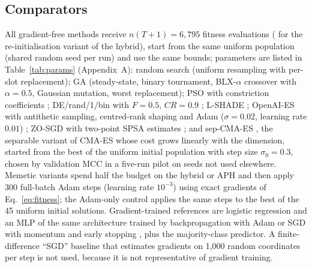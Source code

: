 \documentclass[preprint,12pt]{elsarticle}
\begin{document}
\subsection{Comparators}
All gradient-free methods receive $n(T+1)=6{,}795$ fitness evaluations (\EvalsReinit{} for the re-initialisation variant of the hybrid), start from the same uniform population (shared random seed per run) and use the same bounds; parameters are listed in Table~\ref{tab:params} (Appendix~A):
random search (uniform resampling with per-slot replacement);
GA (steady-state, binary tournament, BLX-$\alpha$ crossover with $\alpha=0.5$, Gaussian mutation, worst replacement);
PSO with constriction coefficients \citep{kennedy1995pso,clerc2002constriction};
DE/rand/1/bin with $F=0.5$, $CR=0.9$ \citep{storn1997de};
L-SHADE \citep{tanabe2014lshade};
OpenAI-ES with antithetic sampling, centred-rank shaping and Adam ($\sigma=0.02$, learning rate $0.01$) \citep{salimans2017es};
ZO-SGD with two-point SPSA estimates \citep{spall1992spsa,malladi2023mezo};
and sep-CMA-ES \citep{ros2008sepcma}, the separable variant of CMA-ES whose cost grows linearly with the dimension, started from the best of the uniform initial population with step size $\sigma_0=0.3$, chosen by validation MCC in a five-run pilot on seeds not used elsewhere.
Memetic variants spend half the budget on the hybrid or APH and then apply 300 full-batch Adam steps \citep{kingma2015adam} (learning rate $10^{-3}$) using exact gradients of Eq.~\eqref{eq:fitness}; the Adam-only control applies the same steps to the best of the 45 uniform initial solutions.
Gradient-trained references are logistic regression and an MLP of the same architecture trained by backpropagation with Adam or SGD with momentum and early stopping \citep{pedregosa2011sklearn}, plus the majority-class predictor. A finite-difference ``SGD'' baseline that estimates gradients on 1,000 random coordinates per step is not used, because it is not representative of gradient training.
\end{document}
